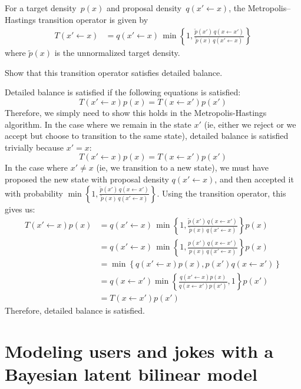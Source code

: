 \documentclass{harvardml}
\theoremstyle{plain}
\begin{document}
\begin{problem}[10 pts]
  For a target density~$p(x)$ and proposal
  density~$q(x'\gets x)$, the Metropolis--Hastings transition
  operator is given by
  \begin{align*}
    T(x'\gets x) &= q(x'\gets x)\,\min\left\{1,
    \frac{\tilde p(x')\,q(x\gets x')}{\tilde p(x)\,q(x'\gets x)}
    \right\}
  \end{align*}
  where $\tilde p(x)$ is the unnormalized target density.

  Show that this transition operator satisfies detailed balance.
\end{problem}

Detailed balance is satisfied if the following equations is satisfied:
$$
T(x' \gets x)p(x) = T(x \gets x')p(x')
$$
Therefore, we simply need to show this holds in the Metropolis-Hastings algorithm. In the case where we remain in the state $x'$ (ie, either we reject or we accept but choose to transition to the same state), detailed balance is satisfied trivially because $x' = x$:
$$
T(x' \gets x)p(x) = T(x \gets x')p(x')
$$
In the case where $x' \neq x$ (ie, we transition to a new state), we must have proposed the new state with proposal density $q(x' \gets x)$, and then accepted it with probability $\min\left\{1,
    \frac{\tilde p(x')\,q(x\gets x')}{\tilde p(x)\,q(x'\gets x)}
    \right\}$.
Using the transition operator, this gives us:
\begin{align*}
T(x' \gets x)p(x) &= q(x'\gets x)\,\min\left\{1,
    \frac{\tilde p(x')\,q(x\gets x')}{\tilde p(x)\,q(x'\gets x)}
    \right\} p(x) \\
    &= q(x'\gets x)\,\min\left\{1,
    \frac{p(x')\,q(x\gets x')}{p(x)\,q(x'\gets x)}
    \right\} p(x) \tag{normalizing constants cancel} \\
    &= \min \left\{ q(x' \gets x)p(x), p(x')q(x \gets x') \right\} \tag{Just factoring some results.} \\
    &= q(x \gets x') \min \left\{\frac{q(x' \gets x)p(x)}{q(x \gets x')p(x')}, 1 \right\} p(x') \tag{factoring} \\
    &= T(x \gets x')p(x')
\end{align*}
Therefore, detailed balance is satisfied.


\newpage

\section*{Modeling users and jokes with a Bayesian latent bilinear model}
\end{document}
